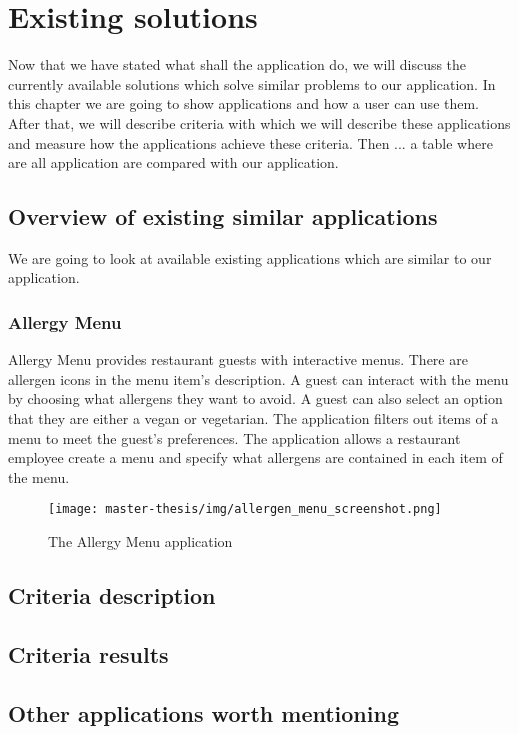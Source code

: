 \chapter{Existing solutions}
Now that we have stated what shall the application do, we will discuss the currently available solutions which solve similar problems to our application.
In this chapter we are going to show applications and how a user can use them.
After that, we will describe criteria with which we will describe these applications and measure how the applications achieve these criteria.
Then ... a table where are all application are compared with our application.

\section{Overview of existing similar applications}
We are going to look at available existing applications which are similar to our application.

\subsection{Allergy Menu}
Allergy Menu provides restaurant guests with interactive menus.
There are allergen icons in the menu item's description.
A guest can interact with the menu by choosing what allergens they want to avoid.
A guest can also select an option that they are either a vegan or vegetarian.
The application filters out items of a menu to meet the guest's preferences.
The application allows a restaurant employee create a menu and specify what allergens are contained in each item of the menu.

\begin{figure}[h]
  \centering
  \texttt{[image: master-thesis/img/allergen\_menu\_screenshot.png]}
  \caption{The Allergy Menu application}
\end{figure}

\section{Criteria description}

\section{Criteria results}

\section{Other applications worth mentioning}
